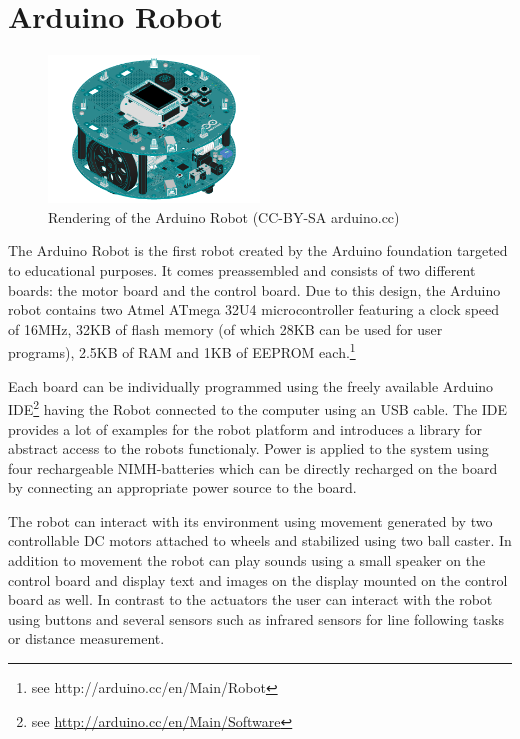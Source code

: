 \section{Arduino Robot}
\begin{figure}[H]
  \centering
  \includegraphics[width=0.5\textwidth]{images/arduinorobot.jpg}
  \caption{Rendering of the Arduino Robot (CC-BY-SA arduino.cc)}
\end{figure}

The Arduino Robot is the first robot created by the Arduino foundation targeted to educational purposes. It comes preassembled and consists of two different boards: the motor board and the control board. Due to this design, the Arduino robot contains two Atmel ATmega 32U4 microcontroller featuring a clock speed of 16MHz, 32KB of flash memory (of which 28KB can be used for user programs), 2.5KB of RAM and 1KB of EEPROM each.\footnote{see {http://arduino.cc/en/Main/Robot}}

Each board can be individually programmed using the freely available Arduino IDE\footnote{see \url{http://arduino.cc/en/Main/Software}} having the Robot connected to the computer using an USB cable. The IDE provides a lot of examples for the robot platform and introduces a library for abstract access to the robots functionaly. Power is applied to the system using four rechargeable NIMH-batteries which can be directly recharged on the board by connecting an appropriate power source to the board.

The robot can interact with its environment using movement generated by two controllable DC motors attached to wheels and stabilized using two ball caster. In addition to movement the robot can play sounds using a small speaker on the control board and display text and images on the display mounted on the control board as well. In contrast to the actuators the user can interact with the robot using buttons and several sensors such as infrared sensors for line following tasks or distance measurement.


